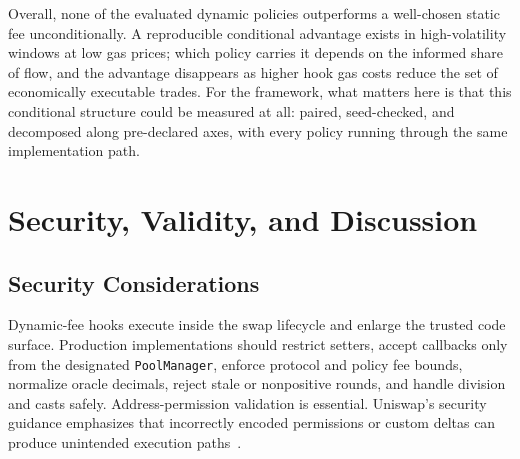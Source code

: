 \documentclass[a4paper,conference]{IEEEtran}
\newcommand\todo[1]{\textcolor{red}{#1}}
\begin{document}
Overall, none of the evaluated dynamic policies outperforms a well-chosen static fee unconditionally. A reproducible conditional advantage exists in high-volatility windows at low gas prices; which policy carries it depends on the informed share of flow, and the advantage disappears as higher hook gas costs reduce the set of economically executable trades. For the framework, what matters here is that this conditional structure could be measured at all: paired, seed-checked, and decomposed along pre-declared axes, with every policy running through the same implementation path.



\section{Security, Validity, and Discussion}
\label{sec:discussion}

\subsection{Security Considerations}

Dynamic-fee hooks execute inside the swap lifecycle and enlarge the trusted code surface. Production implementations should restrict setters, accept callbacks only from the designated \texttt{PoolManager}, enforce protocol and policy fee bounds, normalize oracle decimals, reject stale or nonpositive rounds, and handle division and casts safely. Address-permission validation is essential. Uniswap's security guidance emphasizes that incorrectly encoded permissions or custom deltas can produce unintended execution paths~\cite{uniswapSecurityFramework}.
\end{document}
